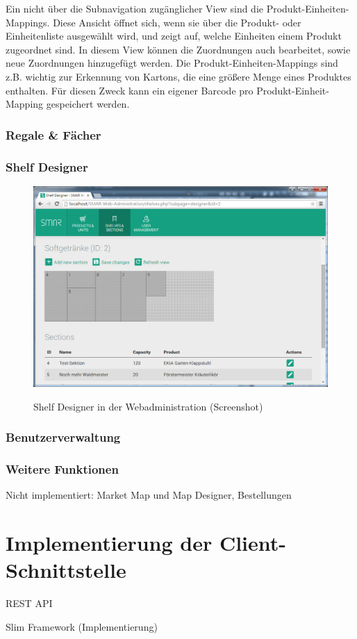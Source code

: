 Ein nicht über die Subnavigation zugänglicher View sind die Produkt-Einheiten-Mappings. Diese Ansicht öffnet sich, wenn sie über die Produkt- oder Einheitenliste ausgewählt wird, und zeigt auf, welche Einheiten einem Produkt zugeordnet sind. In diesem View können die Zuordnungen auch bearbeitet, sowie neue Zuordnungen hinzugefügt werden. Die Produkt-Einheiten-Mappings sind z.B. wichtig zur Erkennung von Kartons, die eine größere Menge eines Produktes enthalten. Für diesen Zweck kann ein eigener Barcode pro Produkt-Einheit-Mapping gespeichert werden.


\subsection{Regale \& Fächer}


\subsection{Shelf Designer}

\begin{figure}[H]
	\centering
	{\includegraphics[width=\textwidth]{Bilder/Abbildungen/webadmin_shelves_designer.png}}
	\caption{Shelf Designer in der Webadministration (Screenshot)}
	\label{fig:webadmin_shelves_designer}
\end{figure}


\subsection{Benutzerverwaltung}


\subsection{Weitere Funktionen}
Nicht implementiert: Market Map und Map Designer, Bestellungen

\chapter{Implementierung der Client-Schnittstelle}

REST API

Slim Framework (Implementierung)



